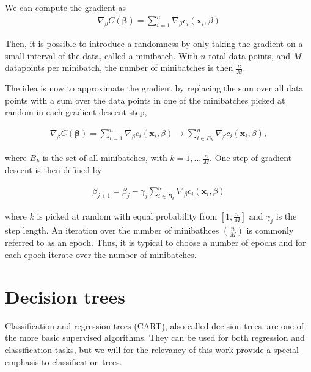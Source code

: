 \noindent We can compute the gradient as
\begin{align*}
\nabla_{\beta} C(\boldsymbol{\beta}) =  \sum_{i=1}^{n} \nabla_{\beta} c_i(\boldsymbol{x}_i,\beta)
\end{align*}

\noindent Then, it is possible to introduce a randomness by only taking the gradient on a small interval of the data, called a minibatch. With $n$ total data points, and $M$ datapoints per minibatch, the number of minibatches is then $\frac{n}{M}$.

The idea is now to approximate the gradient by replacing the sum over all data points with a sum over the data points in one of the minibatches picked at random in each gradient descent step,

\begin{align*}
\nabla_{\beta} C(\boldsymbol{\beta}) =  \sum_{i=1}^{n} \nabla_{\beta} c_i(\boldsymbol{x}_i,\beta) \to \sum_{i \in B_k}^{n} \nabla_{\beta} c_i(\boldsymbol{x}_i,\beta),
\end{align*}

 \noindent where $B_k$ is the set of all minibatches, with $k=1, ..,\frac{n}{M}$. One step of gradient descent is then defined by

\begin{align*}
\beta_{j+1} = \beta_j - \gamma_j \sum_{i \in B_k}^{n} \nabla_{\beta} c_i(\boldsymbol{x}_i,\beta)
\end{align*}

\noindent where $k$ is picked at random with equal probability from $[1, \frac{n}{M}]$ and $\gamma_j$ is the step length. An iteration over the number of minibathces $(\frac{n}{M})$ is commonly referred to as an epoch. Thus, it is typical to choose a number of epochs and for each epoch iterate over the number of minibatches.

\section{Decision trees}
Classification and regression trees (CART), also called decision trees, are one of the more basic supervised algorithms. They can be used for both regression and classification tasks, but we will for the relevancy of this work provide a special emphasis to classification trees.  %


